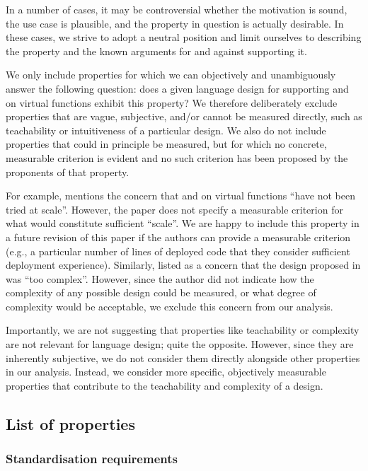 In a number of cases, it may be controversial whether the motivation is sound, the use case is plausible, and the property in question is actually desirable. In these cases, we strive to adopt a neutral position and limit ourselves to describing the property and the known arguments for and against supporting it.

We only include properties for which we can objectively and unambiguously answer the following question: does a given language design for supporting  and  on virtual functions exhibit this property? We therefore deliberately exclude properties that are vague, subjective, and/or cannot be measured directly, such as teachability or intuitiveness of a particular design. We also do not include properties that could in principle be measured, but for which no concrete, measurable criterion is evident and no such criterion has been proposed by the proponents of that property.

For example, \cite{P3573R0} mentions the concern that  and  on virtual functions ``have not been tried at scale''. However, the paper does not specify a measurable criterion for what would constitute sufficient ``scale''. We are happy to include this property in a future revision of this paper if the authors can provide a measurable criterion (e.g., a particular number of lines of deployed code that they consider sufficient deployment experience). Similarly, \cite{P3506R0} listed as a concern that the design proposed in \cite{P3097R0} was ``too complex''. However, since the author did not indicate how the complexity of any possible design could be measured, or what degree of complexity would be acceptable, we exclude this concern from our analysis.

Importantly, we are not suggesting that properties like teachability or complexity are not relevant for language design; quite the opposite. However, since they are inherently subjective, we do not consider them directly alongside other properties in our analysis. Instead, we consider more specific, objectively measurable properties that contribute to the teachability and complexity of a design.

\subsection{List of properties}


\subsubsection{Standardisation requirements}

